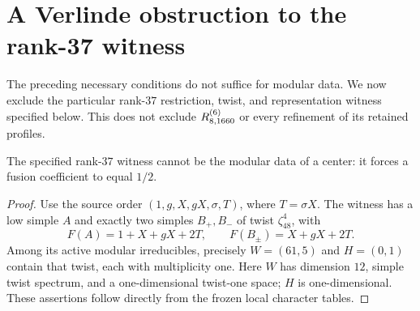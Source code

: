 \section{A Verlinde obstruction to the rank-37 witness}
\label{sec:1660-witness-verlinde}

The preceding necessary conditions do not suffice for modular data. We now
exclude the particular rank-$37$ restriction, twist, and representation
witness specified below. This does not exclude
$R^{(6)}_{8,1660}$ or every refinement of its retained profiles.

\begin{proposition}\label{prop:1660-witness-verlinde}
The specified rank-$37$ witness cannot be the modular data of a center:
it forces a fusion coefficient to equal $1/2$.
\end{proposition}
\begin{proof}
Use the source order $(1,g,X,gX,\sigma,T)$, where $T=\sigma X$.
The witness has a low simple $A$ and exactly two simples $B_+,B_-$ of
twist $\zeta_{48}^{4}$, with
\[
 F(A)=1+X+gX+2T,\qquad F(B_\pm)=X+gX+2T.
\]
Among its active modular irreducibles, precisely $W=(61,5)$ and
$H=(0,1)$ contain that twist, each with multiplicity one. Here $W$ has
dimension $12$, simple twist spectrum, and a one-dimensional twist-one
space; $H$ is one-dimensional. These assertions follow directly from
the frozen local character tables.


\end{proof}
